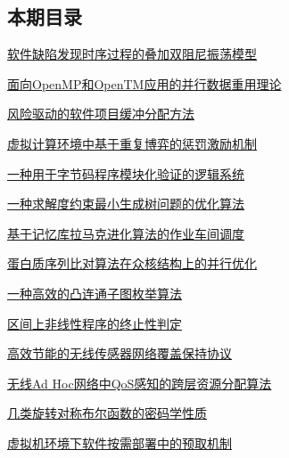 \documentclass[a4paper]{article}
\begin{document}
\subsection{本期目录}
\href{http://www.jos.org.cn/ch/reader/download_pdf.aspx?file_no=3691&year_id=2010&quarter_id=12&falg=1}{软件缺陷发现时序过程的叠加双阻尼振荡模型}

\href{http://www.jos.org.cn/ch/reader/download_pdf.aspx?file_no=3696&year_id=2010&quarter_id=12&falg=1}{面向OpenMP和OpenTM应用的并行数据重用理论}

\href{http://www.jos.org.cn/ch/reader/download_pdf.aspx?file_no=3716&year_id=2010&quarter_id=12&falg=1}{风险驱动的软件项目缓冲分配方法}

\href{http://www.jos.org.cn/ch/reader/download_pdf.aspx?file_no=3717&year_id=2010&quarter_id=12&falg=1}{虚拟计算环境中基于重复博弈的惩罚激励机制}

\href{http://www.jos.org.cn/ch/reader/download_pdf.aspx?file_no=3709&year_id=2010&quarter_id=12&falg=1}{一种用于字节码程序模块化验证的逻辑系统}

\href{http://www.jos.org.cn/ch/reader/download_pdf.aspx?file_no=3713&year_id=2010&quarter_id=12&falg=1}{一种求解度约束最小生成树问题的优化算法}

\href{http://www.jos.org.cn/ch/reader/download_pdf.aspx?file_no=3687&year_id=2010&quarter_id=12&falg=1}{基于记忆库拉马克进化算法的作业车间调度}

\href{http://www.jos.org.cn/ch/reader/download_pdf.aspx?file_no=3645&year_id=2010&quarter_id=12&falg=1}{蛋白质序列比对算法在众核结构上的并行优化}

\href{http://www.jos.org.cn/ch/reader/download_pdf.aspx?file_no=3676&year_id=2010&quarter_id=12&falg=1}{一种高效的凸连通子图枚举算法}

\href{http://www.jos.org.cn/ch/reader/download_pdf.aspx?file_no=3722&year_id=2010&quarter_id=12&falg=1}{区间上非线性程序的终止性判定}

\href{http://www.jos.org.cn/ch/reader/download_pdf.aspx?file_no=3693&year_id=2010&quarter_id=12&falg=1}{高效节能的无线传感器网络覆盖保持协议}

\href{http://www.jos.org.cn/ch/reader/download_pdf.aspx?file_no=3773&year_id=2010&quarter_id=12&falg=1}{无线Ad Hoc网络中QoS感知的跨层资源分配算法}

\href{http://www.jos.org.cn/ch/reader/download_pdf.aspx?file_no=3671&year_id=2010&quarter_id=12&falg=1}{几类旋转对称布尔函数的密码学性质}

\href{http://www.jos.org.cn/ch/reader/download_pdf.aspx?file_no=3715&year_id=2010&quarter_id=12&falg=1}{虚拟机环境下软件按需部署中的预取机制}
\end{document}

